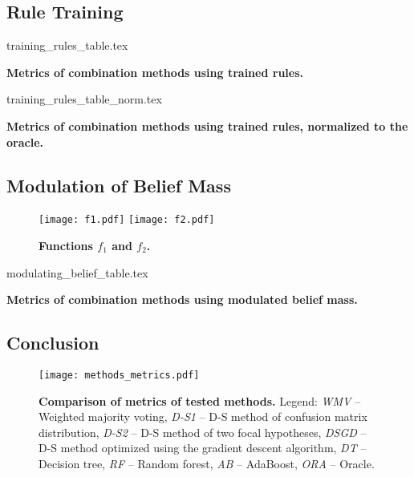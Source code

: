 \documentclass{article}
\begin{document}
\clearpage
\subsection{Rule Training}

\begin{table}[H]
	\centering
	{training_rules_table.tex}
	\caption{\textbf{Metrics of combination methods using trained rules.}}
	\label{tab:metrics-combination-2}
\end{table}

\begin{table}[H]
	\centering
	{training_rules_table_norm.tex}
	\caption{\textbf{Metrics of combination methods using trained rules, normalized to the oracle.}}
	\label{tab:metrics-combination-2-1}
\end{table}

\subsection{Modulation of Belief Mass}

\begin{figure}[H]
	\centering
	\texttt{[image: f1.pdf]}\hfill
	\texttt{[image: f2.pdf]}\\
	\caption{\textbf{Functions $f_1$ and $f_2$.}}
	\label{belief-modulation-functions}
\end{figure}


\begin{table}[H]
	\centering
	{modulating_belief_table.tex}
	\caption{\textbf{Metrics of combination methods using modulated belief mass.}}
\end{table}

\clearpage
\subsection{Conclusion}

\begin{figure}[H]
	\centering
	\texttt{[image: methods\_metrics.pdf]}
    \caption{\textbf{Comparison of metrics of tested methods.} Legend:
    \textit{WMV} -- Weighted majority voting,
    \textit{D-S1} -- D-S method of confusion matrix distribution,
    \textit{D-S2} -- D-S method of two focal hypotheses,
    \textit{DSGD} -- D-S method optimized using the gradient descent algorithm,
    \textit{DT} -- Decision tree,
    \textit{RF} -- Random forest,
    \textit{AB} -- AdaBoost,
    \textit{ORA} -- Oracle.
    }
	\label{metrics-comparison}
\end{figure}
\end{document}
